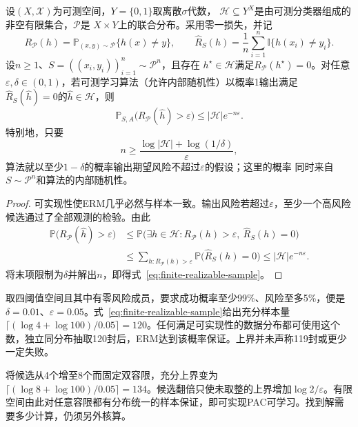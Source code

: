 \begin{theorem}[有限假设空间的可实现PAC样本量界]
\label{thm:finite-realizable-pac}
设$(X,\mathcal X)$为可测空间，$Y=\{0,1\}$取离散$\sigma$代数，
$\mathcal H\subseteq Y^X$是由可测分类器组成的非空有限集合，$\mathcal P$是
$X\times Y$上的联合分布。采用零一损失，并记
\[
 R_{\mathcal P}(h)=\mathbb P_{(x,y)\sim\mathcal P}\{h(x)\neq y\},\qquad
 \hat R_S(h)=\frac1n\sum_{i=1}^n\mathbb I\{h(x_i)\neq y_i\}.
\]
设$n\geq1$、$S=((x_i,y_i))_{i=1}^n\sim\mathcal P^n$，且存在
$h^\star\in\mathcal H$满足$R_{\mathcal P}(h^\star)=0$。对任意
$\varepsilon,\delta\in(0,1)$，若可测学习算法（允许内部随机性）以概率1输出满足
$\hat R_S(\hat h)=0$的$\hat h\in\mathcal H$，则
\begin{equation}
  \mathbb P_{S,A}\bigl(R_{\mathcal P}(\hat h)>\varepsilon\bigr)
  \leq |\mathcal H|e^{-n\varepsilon}.
  \label{eq:finite-realizable-failure}
\end{equation}
特别地，只要
\begin{equation}
  n\geq\frac{\log|\mathcal H|+\log(1/\delta)}{\varepsilon},
  \label{eq:finite-realizable-sample}
\end{equation}
算法就以至少$1-\delta$的概率输出期望风险不超过$\varepsilon$的假设；这里的概率
同时来自$S\sim\mathcal P^n$和算法的内部随机性。
\end{theorem}

\begin{proof}
可实现性使ERM几乎必然与样本一致。输出风险若超过$\varepsilon$，至少一个高风险候选通过了全部观测的检验。由此
\begin{align*}
 \mathbb P\bigl(R_{\mathcal P}(\hat h)>\varepsilon\bigr)
 &\leq \mathbb P\bigl(\exists h\in\mathcal H:
       R_{\mathcal P}(h)>\varepsilon,\ \hat R_S(h)=0\bigr)\\
 &\leq\sum_{h:R_{\mathcal P}(h)>\varepsilon}
       \mathbb P\bigl(\hat R_S(h)=0\bigr)
 \leq |\mathcal H|e^{-n\varepsilon}.
\end{align*}
将末项限制为$\delta$并解出$n$，即得式~\eqref{eq:finite-realizable-sample}。
\end{proof}

取四阈值空间且其中有零风险成员，要求成功概率至少99\%、风险至多5\%，便是$\delta=0.01$、$\varepsilon=0.05$。式~\eqref{eq:finite-realizable-sample}给出充分样本量$\lceil(\log4+\log100)/0.05\rceil=120$。任何满足可实现性的数据分布都可使用这个数，独立同分布抽取120封后，ERM达到该概率保证。上界并未声称119封或更少一定失败。

将候选从4个增至8个而固定双容限，充分上界变为$\lceil(\log8+\log100)/0.05\rceil=134$。候选翻倍只使未取整的上界增加$\log2/\varepsilon$。有限空间由此对任意容限都有分布统一的样本保证，即可实现PAC可学习。找到解需要多少计算，仍须另外核算。

